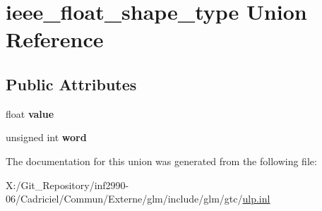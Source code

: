 \hypertarget{unionieee__float__shape__type}{\section{ieee\-\_\-float\-\_\-shape\-\_\-type Union Reference}
\label{unionieee__float__shape__type}
}
\subsection*{Public Attributes}
\begin{DoxyCompactItemize}
\item 
\hypertarget{unionieee__float__shape__type_aa0c47451f1b974421cbb9e2833ddb68e}{float {\bfseries value}}\label{unionieee__float__shape__type_aa0c47451f1b974421cbb9e2833ddb68e}

\item 
\hypertarget{unionieee__float__shape__type_a49230c21acd672d044f38b1abcbd6071}{unsigned int {\bfseries word}}\label{unionieee__float__shape__type_a49230c21acd672d044f38b1abcbd6071}

\end{DoxyCompactItemize}


The documentation for this union was generated from the following file\-:\begin{DoxyCompactItemize}
\item 
X\-:/\-Git\-\_\-\-Repository/inf2990-\/06/\-Cadriciel/\-Commun/\-Externe/glm/include/glm/gtc/\hyperlink{ulp_8inl}{ulp.\-inl}\end{DoxyCompactItemize}
